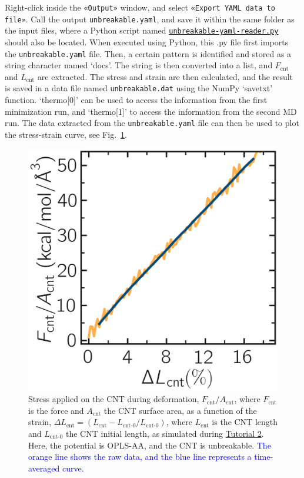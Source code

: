 \documentclass[9pt,tutorial]{livecoms}
\newcommand{\flecmd}[1]{\textcolor{command}{\texttt{#1}}} %
\newcommand{\guicmd}[1]{\textcolor{command}{\texttt{«#1»}}} %
\newcommand{\dwlcmd}[1]{\textcolor{download}{\texttt{#1}}} %
\newcommand{\filepath}{https://raw.githubusercontent.com/lammpstutorials/lammpstutorials-article/main/files/}
\begin{document}
Right-click inside the \guicmd{Output} window, and select
\guicmd{Export YAML data to file}.  Call the output \flecmd{unbreakable.yaml}, and save
it within the same folder as the input files, where a Python script named
\href{\filepath tutorial2/unbreakable-yaml-reader.py}{\dwlcmd{unbreakable-yaml-reader.py}} should also
be located.  When executed using Python, this .py file first imports
the \flecmd{unbreakable.yaml} file.  Then, a certain pattern is
identified and stored as a string character named `docs'.  The string is
then converted into a list, and $F_\text{cnt}$ and $L_\text{cnt}$
are extracted.  The stress and strain are then calculated, and the result
is saved in a data file named \flecmd{unbreakable.dat} using
the NumPy `savetxt' function.  `thermo[0]' can be used to access the
information from the first minimization run, and `thermo[1]' to access the
information from the second MD run.  The data extracted from
the \flecmd{unbreakable.yaml} file can then be used to plot the stress-strain
curve, see Fig.~\ref{fig:CNT-stress-strain-unbreakable}.

\begin{figure}
\centering
\includegraphics[width=0.55\linewidth]{CNT-unbreakable-stress-strain}
\caption{Stress applied on the CNT during deformation, $F_\text{cnt}/A_\text{cnt}$,
where $F_\text{cnt}$ is the force and $A_\text{cnt}$ the CNT surface area,
as a function of the strain, $\Delta L_\text{cnt} = (L_\text{cnt}-L_\text{cnt-0}/L_\text{cnt-0})$, where
$L_\text{cnt}$ is the CNT length and $L_\text{cnt-0}$ the CNT initial length,
as simulated during \hyperref[carbon-nanotube-label]{Tutorial 2}.
Here, the potential is OPLS-AA, and the CNT is unbreakable. \textcolor{blue}{The orange line
shows the raw data, and the blue line represents a time-averaged curve.}
}
\label{fig:CNT-stress-strain-unbreakable}
\end{figure}
\end{document}
